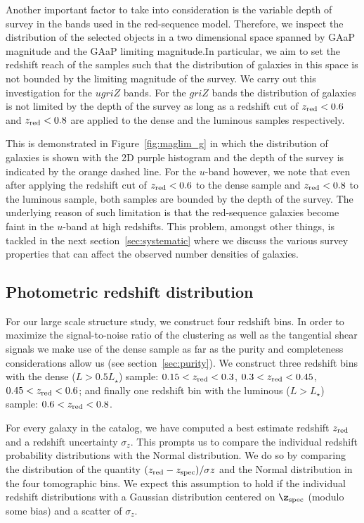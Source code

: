 \documentclass[fleqn,usenatbib,useAMS]{mnras}
\begin{document}
Another important factor to take into consideration is the variable depth of survey in the bands used in the red-sequence model. Therefore, we inspect the distribution of the selected objects in a two dimensional space spanned by GAaP magnitude and the GAaP limiting magnitude.In particular, we aim to set the redshift reach of the samples such that the distribution of galaxies in this space is not bounded by the limiting magnitude of the survey. We carry out this investigation for the $ugriZ$ bands. For the $griZ$ bands the distribution of galaxies is not limited by the depth of the survey as long as a redshift cut of $z_{\rm red} < 0.6$ and $z_{\rm red} < 0.8$ are applied to the dense and the luminous samples respectively. 

This is demonstrated in Figure~\ref{fig:maglim_g} in which the distribution of galaxies is shown with the 2D purple histogram and the depth of the survey is indicated by the orange dashed line. For the $u$-band however, we note that even after applying the redshift cut of $z_{\rm red} < 0.6$ to the dense sample and $z_{\rm red} < 0.8$ to the luminous sample, both samples are bounded by the depth of the survey. The underlying reason of such limitation is that the red-sequence galaxies become faint in the $u$-band at high redshifts. This problem, amongst other things, is tackled in the next section~\ref{sec:systematic} where we discuss the various survey properties that can affect the observed number densities of galaxies.

\subsection{Photometric redshift distribution}

For our large scale structure study, we construct four redshift bins. 
In order to maximize the signal-to-noise ratio of the clustering as well as the tangential shear signals we make use of the dense sample as far as the purity and completeness considerations allow us (see section~\ref{sec:purity}). We construct three redshift bins with the dense ($L > 0.5 L_{\star}$) sample: $0.15<z_{\rm red}<0.3$, $0.3<z_{\rm red}<0.45$, $0.45<z_{\rm red}<0.6$; and finally one redshift bin with the luminous ($L > L_{\star}$) sample: $0.6<z_{\rm red}<0.8$.

For every galaxy in the catalog, we have computed a best estimate redshift $z_{\rm red}$ and a redshift uncertainty $\sigma_z$. This prompts us to compare the individual redshift probability distributions with the Normal distribution. We do so by comparing the distribution of the quantity $(z_{\rm red} - z_{\rm spec})/\sigma{z}$ and the Normal distribution in the four tomographic bins. We expect this assumption to hold if the individual redshift distributions with a Gaussian distribution centered on $\z_{\rm spec}$ (modulo some bias) and a scatter of $\sigma_{z}$. 
\end{document}

